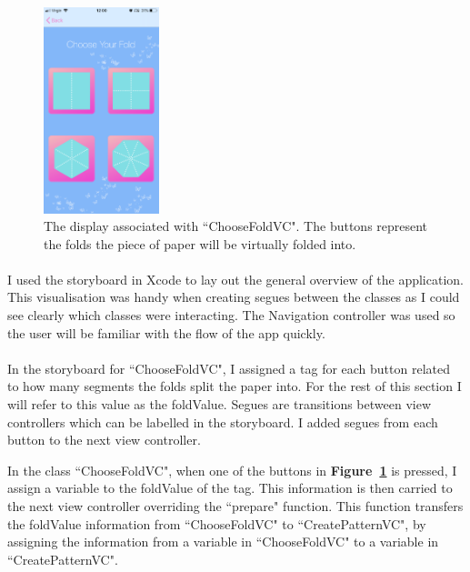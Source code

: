 \documentclass[11pt]{article}
\begin{document}
    \begin{figure}
                        \centering
                        \includegraphics[width=0.3\textwidth]{KiriZen/chooseFold.png}
                        \caption{The display associated with ``ChooseFoldVC". The buttons represent the folds the piece of paper will be virtually folded into.}
                        \label{fig:kiriZen-chooseFold}
                    \end{figure}
    

    \paragraph{}
    I used the storyboard in Xcode to lay out the general overview of the application. This visualisation was handy when creating segues between the classes as I could see clearly which classes were interacting. The Navigation controller was used so the user will be familiar with the flow of the app quickly.

        \paragraph{}
            In the storyboard for ``ChooseFoldVC", I assigned a tag for each button related to how many segments the folds split the paper into. For the rest of this section I will refer to this value as the foldValue. Segues are transitions between view controllers which can be labelled in the storyboard. I added segues from each button to the next view controller.
                    
            In the class ``ChooseFoldVC", when one of the buttons in \textbf{Figure~\ref{fig:kiriZen-chooseFold}} is pressed, I assign a variable to the foldValue of the tag. This information is then carried to the next view controller overriding the ``prepare" function. This function transfers the foldValue information from ``ChooseFoldVC" to ``CreatePatternVC", by assigning the information from a variable in ``ChooseFoldVC" to a variable in ``CreatePatternVC".
                    
\end{document}
